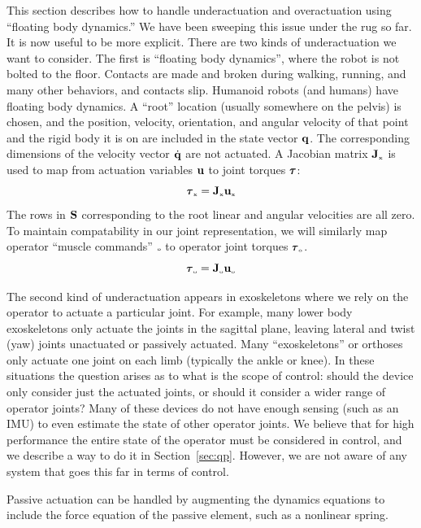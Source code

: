 \documentclass[letterpaper,12pt,fullpage]{article}
\newcommand{\myo}{{\mbox {\tiny o}}}
\newcommand{\myx}{{\mbox {\tiny x}}}
\begin{document}
This section describes how to handle underactuation and overactuation using
``floating body dynamics.''
We have been sweeping this
issue under the rug so far. It is now useful to be more explicit.
There are two kinds of underactuation we want to consider. The first
is ``floating body dynamics'', where the robot is not bolted to the floor.
Contacts are made and broken during walking, running, and many other behaviors,
and contacts slip.
Humanoid robots (and humans) have floating body dynamics.
A ``root'' location (usually somewhere
on the pelvis) is chosen, and the position, velocity, orientation, and angular
velocity of that point and the rigid body it is on
are included in the state vector ${\bf q}$. The corresponding dimensions of the
velocity vector $\dot{{\bf q}}$ are not actuated. A Jacobian matrix
$\mJ_{\myx}$ is used to map from actuation variables ${\bf u}$ to joint torques $\vtau$:
\begin{equation}
\vtau_{\myx} = \mJ_{\myx} \vu_{\myx}
\end{equation}
The rows in ${\bf S}$ corresponding to the root linear and angular velocities
are all zero.
To maintain compatability in our joint representation, we will similarly
map operator ``muscle commands'' $\myo$ to operator joint torques $\vtau_{\myo}$.
\begin{equation}
\vtau_{\myo} = \mJ_{\myo} \vu_{\myo}
\end{equation}

The second kind of underactuation appears in exoskeletons where we rely on the
operator to actuate a particular joint. For example, many lower body
exoskeletons only actuate the joints in the sagittal plane, leaving lateral
and twist (yaw) joints unactuated or passively actuated. 
Many ``exoskeletons'' or orthoses only actuate one joint on each limb (typically
the ankle or knee). In these situations the question arises as to what is
the scope of control: should the device only consider
just the actuated joints,
or should it consider a wider range of operator joints? Many of these devices
do not have enough sensing (such as an IMU) to even estimate the state of other
operator joints. We believe that for high performance the entire state of the
operator must be considered in control, and we describe a way to do it in
Section~\ref{sec:qp}.
However, we are not aware of any system that goes this far in terms of control.

Passive actuation can be handled by augmenting the
dynamics equations to include the force equation of the passive element,
such as a nonlinear spring.
\end{document}
